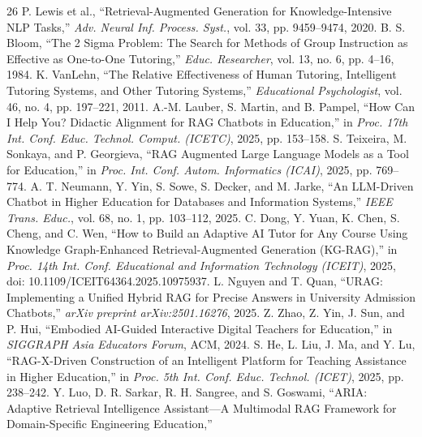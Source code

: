 \documentclass[conference]{IEEEtran}
\begin{document}
\begin{thebibliography}{26}
P. Lewis et al., ``Retrieval-Augmented Generation for Knowledge-Intensive
NLP Tasks,'' \textit{Adv. Neural Inf. Process. Syst.}, vol. 33,
pp. 9459--9474, 2020.
B. S. Bloom, ``The 2 Sigma Problem: The Search for Methods of Group
Instruction as Effective as One-to-One Tutoring,'' \textit{Educ.
Researcher}, vol. 13, no. 6, pp. 4--16, 1984.
K. VanLehn, ``The Relative Effectiveness of Human Tutoring, Intelligent
Tutoring Systems, and Other Tutoring Systems,'' \textit{Educational
Psychologist}, vol. 46, no. 4, pp. 197--221, 2011.
A.-M. Lauber, S. Martin, and B. Pampel, ``How Can I Help You? Didactic
Alignment for RAG Chatbots in Education,'' in \textit{Proc. 17th Int.
Conf. Educ. Technol. Comput. (ICETC)}, 2025, pp. 153--158.
S. Teixeira, M. Sonkaya, and P. Georgieva, ``RAG Augmented Large
Language Models as a Tool for Education,'' in \textit{Proc. Int. Conf.
Autom. Informatics (ICAI)}, 2025, pp. 769--774.
A. T. Neumann, Y. Yin, S. Sowe, S. Decker, and M. Jarke,
``An LLM-Driven Chatbot in Higher Education for Databases and
Information Systems,'' \textit{IEEE Trans. Educ.}, vol. 68, no. 1,
pp. 103--112, 2025.
C. Dong, Y. Yuan, K. Chen, S. Cheng, and C. Wen, ``How to Build an
Adaptive AI Tutor for Any Course Using Knowledge Graph-Enhanced
Retrieval-Augmented Generation (KG-RAG),''
in \textit{Proc. 14th Int. Conf. Educational and Information Technology
(ICEIT)}, 2025, doi: 10.1109/ICEIT64364.2025.10975937.
L. Nguyen and T. Quan, ``URAG: Implementing a Unified Hybrid RAG for
Precise Answers in University Admission Chatbots,''
\textit{arXiv preprint arXiv:2501.16276}, 2025.
Z. Zhao, Z. Yin, J. Sun, and P. Hui, ``Embodied AI-Guided Interactive
Digital Teachers for Education,'' in \textit{SIGGRAPH Asia Educators
Forum}, ACM, 2024.
S. He, L. Liu, J. Ma, and Y. Lu, ``RAG-X-Driven Construction of an
Intelligent Platform for Teaching Assistance in Higher Education,''
in \textit{Proc. 5th Int. Conf. Educ. Technol. (ICET)}, 2025,
pp. 238--242.
Y. Luo, D. R. Sarkar, R. H. Sangree, and S. Goswami,
``ARIA: Adaptive Retrieval Intelligence Assistant---A Multimodal RAG
Framework for Domain-Specific Engineering Education,''

\end{thebibliography}
\end{document}
